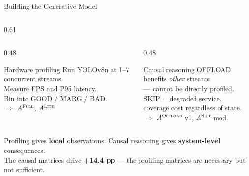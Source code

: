 \documentclass[aspectratio=169,10pt]{beamer}
\begin{document}
\begin{frame}{Building the Generative Model}
\begin{columns}[T]
\begin{column}{0.61\textwidth}
    \begin{columns}[T]
      \begin{column}{0.48\textwidth}
        \begin{block}{Hardware profiling}
          \footnotesize
          Run YOLOv8n at 1–7 concurrent streams.\\
          Measure FPS and P95 latency.\\
          Bin into GOOD / MARG / BAD.\\[5pt]
          $\Rightarrow$ $A^{\textsc{Full}}$, $A^{\textsc{Lite}}$
        \end{block}
      \end{column}
      \begin{column}{0.48\textwidth}
        \begin{block}{Causal reasoning}
          \footnotesize
          OFFLOAD benefits \emph{other} streams\\
          — cannot be directly profiled.\\[2pt]
          SKIP = degraded service,\\
          coverage cost regardless of state.\\[5pt]
          $\Rightarrow$ $A^{\textsc{Offload}}$\,v1, $A^{\textsc{Skip}}$\,mod.
        \end{block}
      \end{column}
    \end{columns}

    \vspace{0.45cm}
    \begin{block}{}
      \footnotesize\centering
      Profiling gives \textbf{local} observations.\quad
      Causal reasoning gives \textbf{system-level} consequences.\\[3pt]
      The causal matrices drive \textbf{+14.4 pp} —
      the profiling matrices are necessary but not sufficient.
    \end{block}
  \end{column}

\end{columns}
\end{frame}
\end{document}
